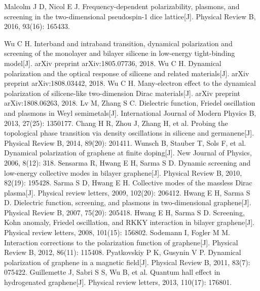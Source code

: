 \documentclass[UTF8,a4paper]{article}
\begin{document}
\begin{thebibliography}{99}
Malcolm J D, Nicol E J. Frequency-dependent polarizability, plasmons, and screening in the two-dimensional pseudospin-1 dice lattice[J]. Physical Review B, 2016, 93(16): 165433.

Wu C H. Interband and intraband transition, dynamical polarization and screening of the monolayer and bilayer silicene in low-energy tight-binding model[J]. arXiv preprint arXiv:1805.07736, 2018.
Wu C H. Dynamical polarization and the optical response of silicene and related materials[J]. arXiv preprint arXiv:1808.03442, 2018.
Wu C H. Many-electron effect to the dynamical polarization of silicene-like two-dimension Dirac materials[J]. arXiv preprint arXiv:1808.06263, 2018.
Lv M, Zhang S C. Dielectric function, Friedel oscillation and plasmons in Weyl semimetals[J]. International Journal of Modern Physics B, 2013, 27(25): 1350177.
Chang H R, Zhou J, Zhang H, et al. Probing the topological phase transition via density oscillations in silicene and germanene[J]. Physical Review B, 2014, 89(20): 201411.
Wunsch B, Stauber T, Sols F, et al. Dynamical polarization of graphene at finite doping[J]. New Journal of Physics, 2006, 8(12): 318.
Sensarma R, Hwang E H, Sarma S D. Dynamic screening and low-energy collective modes in bilayer graphene[J]. Physical Review B, 2010, 82(19): 195428.
Sarma S D, Hwang E H. Collective modes of the massless Dirac plasma[J]. Physical review letters, 2009, 102(20): 206412.
Hwang E H, Sarma S D. Dielectric function, screening, and plasmons in two-dimensional graphene[J]. Physical Review B, 2007, 75(20): 205418.
Hwang E H, Sarma S D. Screening, Kohn anomaly, Friedel oscillation, and RKKY interaction in bilayer graphene[J]. Physical review letters, 2008, 101(15): 156802.
Sodemann I, Fogler M M. Interaction corrections to the polarization function of graphene[J]. Physical Review B, 2012, 86(11): 115408.
Pyatkovskiy P K, Gusynin V P. Dynamical polarization of graphene in a magnetic field[J]. Physical Review B, 2011, 83(7): 075422.
Guillemette J, Sabri S S, Wu B, et al. Quantum hall effect in hydrogenated graphene[J]. Physical review letters, 2013, 110(17): 176801.

\end{thebibliography}
\end{document}

